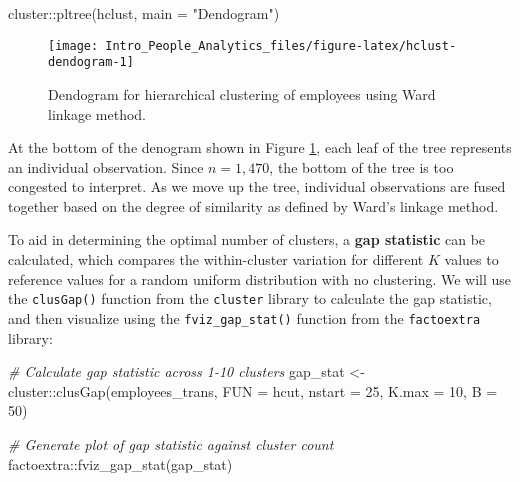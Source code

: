 \documentclass[
]{book}
\newenvironment{Shaded}{\begin{snugshade}}{\end{snugshade}}
\newcommand{\AttributeTok}[1]{\textcolor[rgb]{0.77,0.63,0.00}{#1}}
\newcommand{\CommentTok}[1]{\textcolor[rgb]{0.56,0.35,0.01}{\textit{#1}}}
\newcommand{\DecValTok}[1]{\textcolor[rgb]{0.00,0.00,0.81}{#1}}
\newcommand{\FunctionTok}[1]{\textcolor[rgb]{0.00,0.00,0.00}{#1}}
\newcommand{\NormalTok}[1]{#1}
\newcommand{\OtherTok}[1]{\textcolor[rgb]{0.56,0.35,0.01}{#1}}
\newcommand{\SpecialCharTok}[1]{\textcolor[rgb]{0.00,0.00,0.00}{#1}}
\newcommand{\StringTok}[1]{\textcolor[rgb]{0.31,0.60,0.02}{#1}}
\begin{document}
\begin{Shaded}
\begin{Highlighting}[]
\NormalTok{cluster}\SpecialCharTok{::}\FunctionTok{pltree}\NormalTok{(hclust, }\AttributeTok{main =} \StringTok{"Dendogram"}\NormalTok{)}
\end{Highlighting}
\end{Shaded}

\begin{figure}

{\centering \texttt{[image: Intro\_People\_Analytics\_files/figure-latex/hclust-dendogram-1]} 

}

\caption{Dendogram for hierarchical clustering of employees using Ward linkage method.}\label{fig:hclust-dendogram}
\end{figure}

At the bottom of the denogram shown in Figure \ref{fig:hclust-dendogram}, each leaf of the tree represents an individual observation. Since \(n = 1,470\), the bottom of the tree is too congested to interpret. As we move up the tree, individual observations are fused together based on the degree of similarity as defined by Ward's linkage method.

To aid in determining the optimal number of clusters, a \textbf{gap statistic} can be calculated, which compares the within-cluster variation for different \(K\) values to reference values for a random uniform distribution with no clustering. We will use the \texttt{clusGap()} function from the \texttt{cluster} library to calculate the gap statistic, and then visualize using the \texttt{fviz\_gap\_stat()} function from the \texttt{factoextra} library:

\begin{Shaded}
\begin{Highlighting}[]
\CommentTok{\# Calculate gap statistic across 1{-}10 clusters}
\NormalTok{gap\_stat }\OtherTok{\textless{}{-}}\NormalTok{ cluster}\SpecialCharTok{::}\FunctionTok{clusGap}\NormalTok{(employees\_trans, }\AttributeTok{FUN =}\NormalTok{ hcut, }\AttributeTok{nstart =} \DecValTok{25}\NormalTok{, }\AttributeTok{K.max =} \DecValTok{10}\NormalTok{, }\AttributeTok{B =} \DecValTok{50}\NormalTok{)}

\CommentTok{\# Generate plot of gap statistic against cluster count}
\NormalTok{factoextra}\SpecialCharTok{::}\FunctionTok{fviz\_gap\_stat}\NormalTok{(gap\_stat)}
\end{Highlighting}
\end{Shaded}
\end{document}
